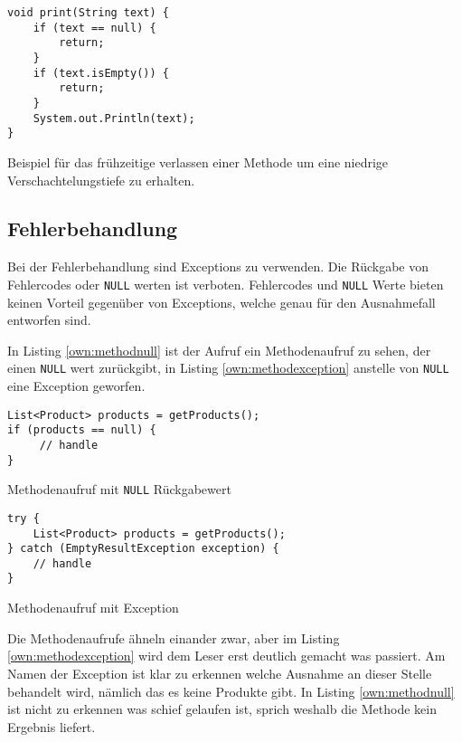 \begin{listing}[H]
    \begin{verbatim}
void print(String text) {
    if (text == null) {
        return;
    }
    if (text.isEmpty()) {
        return;
    }
    System.out.Println(text);
}
    \end{verbatim}
    \caption{Beispiel für das frühzeitige verlassen einer Methode um eine niedrige Verschachtelungstiefe zu erhalten.}
    \label{own:lowindent}
\end{listing}

\subsection{Fehlerbehandlung}
Bei der Fehlerbehandlung sind Exceptions zu verwenden. Die Rückgabe von Fehlercodes oder \texttt{NULL} werten ist verboten. Fehlercodes und \texttt{NULL} Werte bieten keinen Vorteil gegenüber von Exceptions, welche genau für den Ausnahmefall entworfen sind. 

In Listing \ref{own:methodnull} ist der Aufruf ein Methodenaufruf zu sehen, der einen \texttt{NULL} wert zurückgibt, in Listing \ref{own:methodexception} anstelle von \texttt{NULL} eine Exception geworfen.

\begin{listing}[H]
    \begin{verbatim}
List<Product> products = getProducts();
if (products == null) {
     // handle
}
    \end{verbatim}
    \caption{Methodenaufruf mit \texttt{NULL} Rückgabewert}
    \label{own:methodnull}
\end{listing}

\begin{listing}[H]
    \begin{verbatim}
try {
    List<Product> products = getProducts();
} catch (EmptyResultException exception) {
    // handle
}
    \end{verbatim}
    \caption{Methodenaufruf mit Exception}
    \label{own:methodexception}
\end{listing}

Die Methodenaufrufe ähneln einander zwar, aber im Listing \ref{own:methodexception} wird dem Leser erst deutlich gemacht was passiert. Am Namen der Exception ist klar zu erkennen welche Ausnahme an dieser Stelle behandelt wird, nämlich das es keine Produkte gibt. In Listing \ref{own:methodnull} ist nicht zu erkennen was schief gelaufen ist, sprich weshalb die Methode kein Ergebnis liefert.

